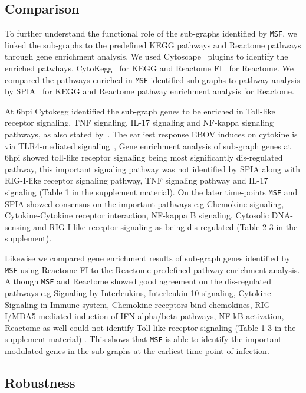 \documentclass[twocolumn]{article}
\begin{document}
 

\subsection*{Comparison} 

To further understand the functional role of the sub-graphs identified by \texttt{MSF}, we linked the  sub-graphs to the predefined KEGG pathways and Reactome
pathways through gene enrichment analysis. We used Cytoscape~\cite{Cyto} plugins to identify the enriched patwhays, CytoKegg~\cite{Cytokegg} for KEGG and Reactome FI~\cite{Reactome} for Reactome. We compared the pathways enriched in \texttt{MSF} identified sub-graphs to pathway analysis by SPIA~\cite{Tarca} for KEGG and Reactome pathway enrichment analysis for Reactome. 

At 6hpi Cytokegg identified the sub-graph genes to be enriched in Toll-like receptor signaling, TNF signaling, IL-17 signaling and NF-kappa signaling pathways, as also stated by~\cite{Olejnik}. The earliest response EBOV induces on cytokine is via TLR4-mediated signaling~\cite{Olejnik}, Gene enrichment analysis of sub-graph genes at 6hpi showed toll-like receptor signaling being most significantly dis-regulated pathway, this important signaling pathway was not identified by SPIA along with RIG-I-like receptor signaling pathway, TNF signaling pathway and IL-17 signaling (Table 1 in the supplement material). On the later time-points \texttt{MSF} and SPIA showed consensus on the important pathways e.g Chemokine signaling, Cytokine-Cytokine receptor interaction, NF-kappa B signaling, Cytosolic DNA-sensing and RIG-I-like receptor signaling as being dis-regulated (Table 2-3 in the supplement). 

Likewise we compared gene enrichment results of sub-graph genes identified by \texttt{MSF} using Reactome FI to the Reactome predefined pathway enrichment analysis. Although \texttt{MSF} and Reactome showed good agreement on the dis-regulated pathways e.g Signaling by Interleukins, Interleukin-10 signaling, Cytokine Signaling in Immune system, Chemokine receptors bind chemokines, RIG-I/MDA5 mediated induction of IFN-alpha/beta pathways, NF-kB activation, Reactome as well could not identify Toll-like receptor signaling (Table 1-3 in the supplement material) . This shows that \texttt{MSF} is able to identify the important modulated genes in the sub-graphs at the earliest time-point of infection.

\subsection*{Robustness}
\end{document}
